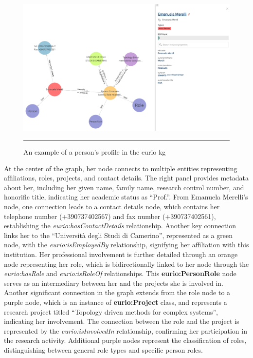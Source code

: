\begin{figure}[htbp]
    \centering
 \includegraphics[width=.9\textwidth]{figures/architecture/example-person-prof-merelli.png}
     \rule{35em}{0.5pt}
    \caption{An example of a person's profile in the \gls{eurio} \gls{kg}}
 \label{fig:example-person-prof-merelli}
\end{figure}

At the center of the graph, her node connects to multiple entities representing affiliations, roles, projects, and contact details.
The right panel provides metadata about her, including her given name, family name, research control number, and honorific title, indicating her academic status as ``Prof.''.
From Emanuela Merelli's node, one connection leads to a contact details node, which contains her telephone number (+390737402567) and fax number (+390737402561), establishing the \textit{eurio:hasContactDetails} relationship.
Another key connection links her to the ``Universit\`a degli Studi di Camerino'', represented as a green node, with the \textit{eurio:isEmployedBy} relationship, signifying her affiliation with this institution.
Her professional involvement is further detailed through an orange node representing her role, which is bidirectionally linked to her node through the \textit{eurio:hasRole} and \textit{eurio:isRoleOf} relationships.
This \textbf{eurio:PersonRole} node serves as an intermediary between her and the projects she is involved in.
Another significant connection in the graph extends from the role node to a purple node, which is an instance of \textbf{eurio:Project} class, and represents a research project titled ``Topology driven methods for complex systems'', indicating her involvement.
The connection between the role and the project is represented by the \textit{eurio:isInvolvedIn} relationship, confirming her participation in the research activity.
Additional purple nodes represent the classification of roles, distinguishing between general role types and specific person roles.


